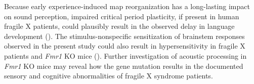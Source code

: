 Because early experience-induced map reorganization has a long-lasting impact on sound perception, impaired critical period plasticity, if present in human fragile X patients, could plausibly result in the observed delay in language development (\cite{Finestack2009}). The stimulus-nonspecific sensitization of brainstem responses observed in the present study could also result in hypersensitivity in fragile X patients and \textit{Fmr1} KO mice (\cite{Miller1999, Chen2001, Nielsen2002, Tsiouris2004}). Further investigation of acoustic processing in \textit{Fmr1} KO mice may reveal how the gene mutation results in the documented sensory and cognitive abnormalities of fragile X syndrome patients.

\printbibliography